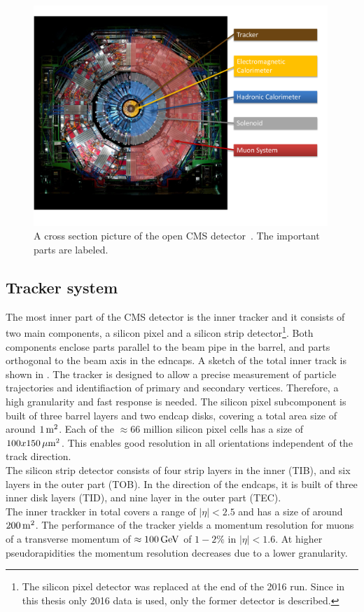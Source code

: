 \begin{figure}[hbtp]
 \centering
 \includegraphics[width=0.99\textwidth]{figures/general/CMS}
 \caption{A cross section picture of the open CMS detector~\cite{CMSPicture}. The important parts are labeled.}
 \label{fig:CMS}
\end{figure}

\subsection{Tracker system}
The most inner part of the CMS detector is the inner tracker and it consists of two main components, a silicon pixel and a silicon strip detector\footnote{The silicon pixel detector was replaced at the end of the 2016 run. Since in this thesis only 2016 data is used, only the former detector is described.}. Both components enclose parts parallel to the beam pipe in the barrel, and parts orthogonal to the beam axis in the edncaps. A sketch of the total inner track is shown in . The tracker is designed to allow a precise measurement of particle trajectories and identifiaction of primary and secondary vertices. Therefore, a high granularity and fast response is needed. The silicon pixel subcomponent is built of three barrel layers and two endcap disks, covering a total area size of around $1\,\text{m}^2$. Each of the $\approx66$ million silicon pixel cells has a size of $100x150\,\mu\text{m}^2$. This enables good resolution in all orientations independent of the track direction.\\
The silicon strip detector consists of four strip layers in the inner (TIB), and six layers in the outer part (TOB). In the direction of the endcaps, it is built of three inner disk layers (TID), and nine layer in the outer part (TEC).\\
The inner trackker in total covers a range of $|\eta|<2.5$ and has a size of around $200\,\text{m}^2$. The performance of the tracker yields a momentum resolution for muons of a transverse momentum of $\approx100\,\text{Ge\hspace{-.08em}V}$ of $1-2\%$ in $|\eta|<1.6$. At higher pseudorapidities the momentum resolution decreases due to a lower granularity.

